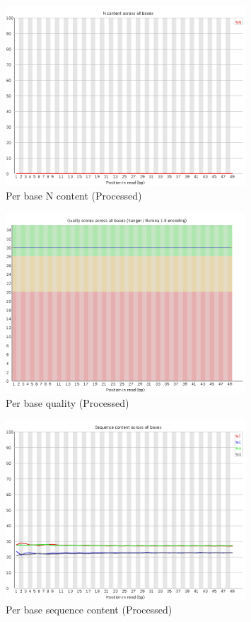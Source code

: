 \documentclass[UTF8]{ctexart}
\begin{document}
\begin{figure}[!htb]
	\centering
	\includegraphics[width=0.8\textwidth]{img/SRR14325859_FastQC_Processed_img/per_base_n_content.png}	
	\caption{Per base N content (Processed)\protect}    
\end{figure}


\begin{figure}[!htb]
	\centering
	\includegraphics[width=0.8\textwidth]{img/SRR14325859_FastQC_Processed_img/per_base_quality.png}	
	\caption{Per base quality (Processed)\protect}    
\end{figure}

\begin{figure}[!htb]
	\centering
	\includegraphics[width=0.8\textwidth]{img/SRR14325859_FastQC_Processed_img/per_base_sequence_content.png}	
	\caption{Per base sequence content (Processed)\protect}    
\end{figure}
\end{document}
